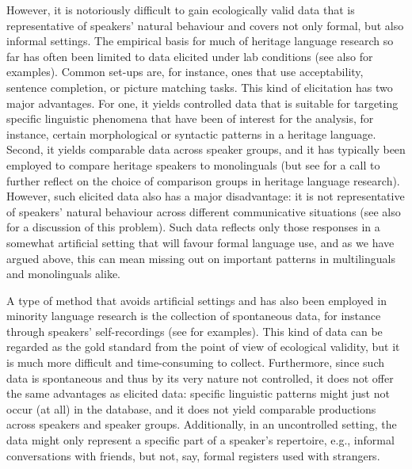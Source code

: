 \documentclass[output=paper,colorlinks,citecolor=brown]{langscibook}
\begin{document}
However, it is notoriously difficult to gain ecologically valid data that is representative of speakers’ natural behaviour and covers not only formal, but also informal settings. The empirical basis for much of heritage language research so far has often been limited to data elicited under lab conditions (see also \cites[Chapter 6]{montrul2015}[Chapter 3]{polinsky2018}  for examples). Common set-ups are, for instance, ones that use acceptability, sentence completion, or picture matching tasks. This kind of elicitation has two major advantages. For one, it yields controlled data that is suitable for targeting specific linguistic phenomena that have been of interest for the analysis, for instance, certain morphological or syntactic patterns in a heritage language. Second, it yields comparable data across speaker groups, and it has typically been employed to compare heritage speakers to monolinguals (but see \cite{rothmanetal2022} for a call to further reflect on the choice of comparison groups in heritage language research). However, such elicited data also has a major disadvantage: it is not representative of speakers’ natural behaviour across different communicative situations (see also \cite[Chapter 5]{aalberseetal2019} for a discussion of this problem). Such data reflects only those responses in a somewhat artificial setting that will favour formal language use, and as we have argued above, this can mean missing out on important patterns in multilinguals and monolinguals alike.

A type of method that avoids artificial settings and has also been employed in minority language research is the collection of spontaneous data, for instance through speakers’ self-recordings (see \cite[Chapter 5]{aalberseetal2019} for examples). This kind of data can be regarded as the gold standard from the point of view of ecological validity, but it is much more difficult and time-consuming to collect. Furthermore, since such data is spontaneous and thus by its very nature not controlled, it does not offer the same advantages as elicited data: specific linguistic patterns might just not occur (at all) in the database, and it does not yield comparable productions across speakers and speaker groups. Additionally, in an uncontrolled setting, the data might only represent a specific part of a speaker’s repertoire, e.g., informal conversations with friends, but not, say, formal registers used with strangers.
\end{document}
